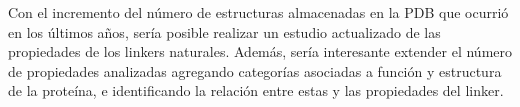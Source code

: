 % 









Con el incremento del número de estructuras almacenadas en la PDB que ocurrió en los últimos años, sería posible realizar un estudio actualizado de las propiedades de los linkers naturales.
Además, sería interesante extender el número de propiedades analizadas agregando categorías asociadas a función y estructura de la proteína, e identificando la relación entre estas y las propiedades del linker.


